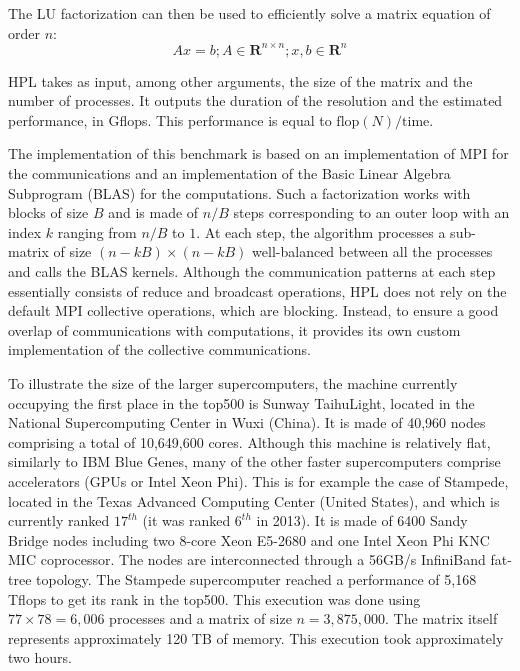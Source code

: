 \documentclass[12pt, a4paper]{memoir}
\begin{document}
The LU factorization can then be used to efficiently solve a matrix equation of order \(n\):
\[Ax = b ; A \in \mathbf{R}^{n \times n} ; x,b \in \mathbf{R}^n\]

HPL takes as input, among other arguments, the size of the matrix and the number of processes. It outputs the
duration of the resolution and the estimated performance, in Gflops. This performance is equal to
\(\mathrm{flop}(N)/\mathrm{time}\).

The implementation of this benchmark is based on an implementation of MPI for the communications and an
implementation of the Basic Linear Algebra Subprogram (BLAS) for the computations. Such a factorization works with
blocks of size \(B\) and is made of \(n/B\) steps corresponding to an outer loop with an index \(k\) ranging from \(n/B\) to
\(1\). At each step, the algorithm processes a sub-matrix of size \((n-kB)\times(n-kB)\) well-balanced between all the
processes and calls the BLAS kernels. Although the communication patterns at each step essentially consists of reduce
and broadcast operations, HPL does not rely on the default MPI collective operations, which are blocking. Instead, to
ensure a good overlap of communications with computations, it provides its own custom implementation of the
collective communications.

To illustrate the size of the larger supercomputers, the machine currently occupying the first place in the top500 is
Sunway TaihuLight, located in the National Supercomputing Center in Wuxi (China). It is made of 40,960 nodes
comprising a total of 10,649,600 cores. Although this machine is relatively flat, similarly to IBM Blue Genes, many
of the other faster supercomputers comprise accelerators (GPUs or Intel Xeon Phi). This is for example the case of
Stampede, located in the Texas Advanced Computing Center (United States), and which is currently ranked \(17^{th}\) (it
was ranked \(6^{th}\) in 2013). It is made of 6400 Sandy Bridge nodes including two 8-core Xeon E5-2680 and one Intel Xeon
Phi KNC MIC coprocessor. The nodes are interconnected through a 56GB/s InfiniBand fat-tree topology.  The Stampede
supercomputer reached a performance of 5,168 Tflops to get its rank in the top500. This execution was done using \(77
   \times 78 = 6,006\) processes and a matrix of size \(n=3,875,000\). The matrix itself represents approximately 120 TB of
memory. This execution took approximately two hours.
\end{document}

